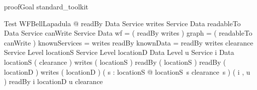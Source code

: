 \begin{zsection}
   \SECTION proofGoal \parents standard\_toolkit
\end{zsection}

\begin{theorem}{Test}
    \forall WFBellLapadula @
      readBy \in Data \rel Service \land writes \in Service \rel Data \land
      readableTo \in Data \rel Service \land canWrite \in Service \rel Data \land
      wf = ( readBy \comp writes ) \plus \land graph = ( readableTo \comp canWrite ) \plus \land
      knownServices = \dom writes \cup \ran readBy \land knownData = \dom readBy \cup \ran writes \land
      clearance \in Service \pfun Level \land locationS \in Service \pfun Level \land
      locationD \in Data \pfun Level \land u \in Service \land i \in Data \land
      \dom locationS \in \power ( \dom clearance ) \land \dom writes \in \power ( \dom locationS ) \land
      \ran readBy \in \power ( \dom locationS ) \land \dom readBy \in \power ( \dom locationD ) \land
      \ran writes \in \power ( \dom locationD ) \land ( \forall s : \dom locationS @ locationS~s \leq clearance~s )
      \land ( i , u ) \in readBy \implies i \in \dom locationD \land u \in \dom clearance
\end{theorem}
